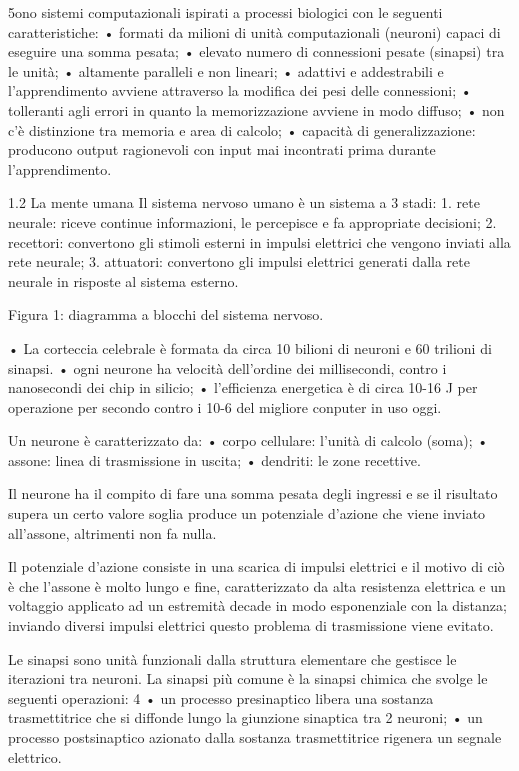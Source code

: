 \documentclass[12pt,a4paper,oneside]{book}
\begin{document}
		5ono sistemi computazionali ispirati a processi biologici con le seguenti caratteristiche:  • formati da milioni di unità computazionali (neuroni) capaci di eseguire una somma pesata;  • elevato numero di connessioni pesate (sinapsi) tra le unità;  • altamente paralleli e non lineari;  • adattivi e addestrabili e l'apprendimento avviene attraverso la modifica dei pesi delle connessioni;  • tolleranti agli errori in quanto la memorizzazione avviene in modo diffuso;  • non c'è distinzione tra memoria e area di calcolo;  • capacità di generalizzazione: producono output ragionevoli con input mai incontrati prima durante l'apprendimento. 
		
		1.2 La mente umana Il sistema nervoso umano è un sistema a 3 stadi:  1. rete neurale: riceve continue informazioni, le percepisce e fa appropriate decisioni; 2. recettori: convertono gli stimoli esterni in impulsi elettrici che vengono inviati alla rete neurale; 3. attuatori: convertono gli impulsi elettrici generati dalla rete neurale in risposte al sistema esterno. 
		
		
		Figura 1: diagramma a blocchi del sistema nervoso. 
		
		• La corteccia celebrale è formata da circa 10 bilioni di neuroni e 60 trilioni di sinapsi. • ogni neurone ha velocità dell'ordine dei millisecondi, contro i nanosecondi dei chip in silicio; • l'efficienza energetica è di circa 10-16 J per operazione per secondo contro i 10-6 del migliore conputer in uso oggi. 
		
		Un neurone è caratterizzato da: • corpo cellulare: l'unità di calcolo (soma); • assone: linea di trasmissione in uscita; • dendriti: le zone recettive. 
		
		Il neurone ha il compito di fare una somma pesata degli ingressi e se il risultato supera un certo valore soglia produce un potenziale d'azione che viene inviato all'assone, altrimenti non fa nulla. 
		
		Il potenziale d'azione consiste in una scarica di impulsi elettrici e il motivo di ciò è che l'assone è molto lungo e fine, caratterizzato da alta resistenza elettrica e un voltaggio applicato ad un estremità decade in modo esponenziale con la distanza; inviando diversi impulsi elettrici questo problema di trasmissione viene evitato. 
		
		Le sinapsi sono unità funzionali dalla struttura elementare che gestisce le iterazioni tra neuroni. La sinapsi più comune è la sinapsi chimica che svolge le seguenti operazioni: 
		4
		• un processo presinaptico libera una sostanza trasmettitrice che si diffonde lungo la giunzione sinaptica tra 2 neuroni; • un processo postsinaptico azionato dalla sostanza trasmettitrice rigenera un segnale elettrico. 
		
\end{document}
